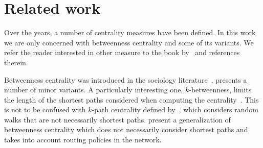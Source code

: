 \section{Related work}\label{sec:prevwork}
Over the years, a number of centrality measures have been defined. In this work
we are only concerned with betweenness centrality and some of its variants. We
refer the reader interested in other measure to the book by~\citet{Newman10} and
references therein.

Betweenness centrality was introduced in the sociology
literature~\citep{Anthonisse71,Freeman77}. \citet{Brandes08} presents a number
of minor variants. A particularly interesting one, $k$-betweenness, limits the
length of the shortest paths considered when computing the
centrality~\citep{BorgattiE06,Brandes08,PfefferC12}. This is not to be confused
with $k$-path centrality defined by~\citet{KourtellisASIT12}, which considers
random walks that are not necessarily shortest paths. \citet{DolevEP10} present
a generalization of betweenness centrality which does not necessarily consider
shortest paths and takes into account routing policies in the network. 

